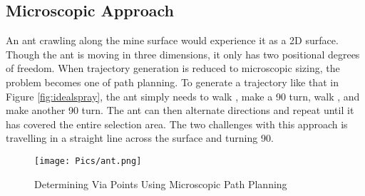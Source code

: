 \subsection{Microscopic Approach}

An ant crawling along the mine surface would experience it as a 2D surface. Though the ant is moving in three dimensions, it only has two positional degrees of freedom. When trajectory generation is reduced to microscopic sizing, the problem becomes one of path planning. To generate a trajectory like that in Figure \ref{fig:idealspray}, the ant simply needs to walk , make a 90\degree\hspace{0pt} turn, walk , and make another 90\degree\hspace{0pt} turn. The ant can then alternate directions and repeat until it has covered the entire selection area. The two challenges with this approach is travelling in a straight line across the surface and turning 90\degree\hspace{0pt}.\\


\begin{figure}[h!]
    \centering
    \texttt{[image: Pics/ant.png]}
    \caption{Determining Via Points Using Microscopic Path Planning}
    \label{fig:ant}
\end{figure}

